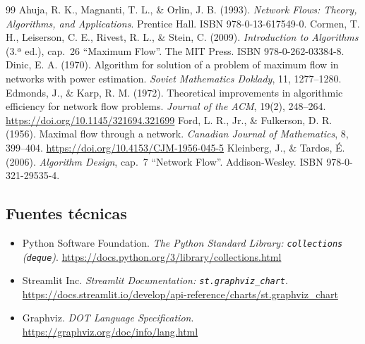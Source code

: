 \documentclass[12pt, a4paper]{article}
\begin{document}
\renewcommand{\refname}{Referencias: fuentes académicas}
\begin{thebibliography}{99}
   Ahuja, R. K., Magnanti, T. L., \& Orlin, J. B. (1993). \emph{Network Flows: Theory, Algorithms, and Applications}. Prentice Hall. ISBN 978-0-13-617549-0.
   Cormen, T. H., Leiserson, C. E., Rivest, R. L., \& Stein, C. (2009). \emph{Introduction to Algorithms} (3.ª ed.), cap.~26 ``Maximum Flow''. The MIT Press. ISBN 978-0-262-03384-8.
   Dinic, E. A. (1970). Algorithm for solution of a problem of maximum flow in networks with power estimation. \emph{Soviet Mathematics Doklady}, 11, 1277--1280.
   Edmonds, J., \& Karp, R. M. (1972). Theoretical improvements in algorithmic efficiency for network flow problems. \emph{Journal of the ACM}, 19(2), 248--264. \url{https://doi.org/10.1145/321694.321699}
   Ford, L. R., Jr., \& Fulkerson, D. R. (1956). Maximal flow through a network. \emph{Canadian Journal of Mathematics}, 8, 399--404. \url{https://doi.org/10.4153/CJM-1956-045-5}
   Kleinberg, J., \& Tardos, É. (2006). \emph{Algorithm Design}, cap.~7 ``Network Flow''. Addison-Wesley. ISBN 978-0-321-29535-4.
\end{thebibliography}

\subsection*{Fuentes técnicas}
\begin{itemize}
  \item Python Software Foundation. \emph{The Python Standard Library: \texttt{collections} (\texttt{deque})}. \url{https://docs.python.org/3/library/collections.html}
  \item Streamlit Inc. \emph{Streamlit Documentation: \texttt{st.graphviz\_chart}}. \url{https://docs.streamlit.io/develop/api-reference/charts/st.graphviz_chart}
  \item Graphviz. \emph{DOT Language Specification}. \url{https://graphviz.org/doc/info/lang.html}
\end{itemize}
\end{document}
